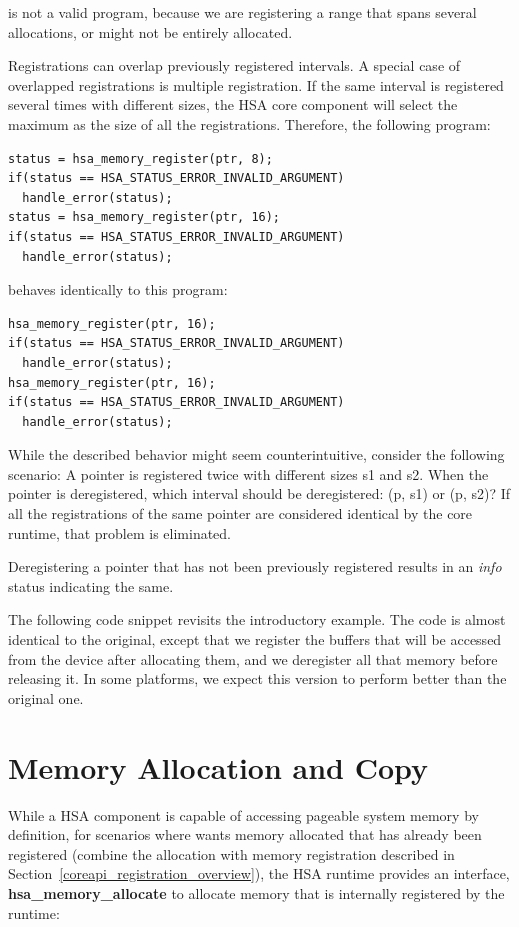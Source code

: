 \documentclass{book}
\newcommand{\reffun}[1]{\textbf{#1}}
\begin{document}
is not a valid program, because we are registering a range that
spans several allocations, or might not be entirely allocated.

Registrations can overlap previously registered intervals. A special
case of overlapped registrations is multiple registration. If the
same interval is registered several times with different sizes, the
HSA core component will select the maximum as the size of all
the registrations. Therefore, the following program:

\begin{lstlisting}
status = hsa_memory_register(ptr, 8);
if(status == HSA_STATUS_ERROR_INVALID_ARGUMENT)
  handle_error(status);
status = hsa_memory_register(ptr, 16);
if(status == HSA_STATUS_ERROR_INVALID_ARGUMENT)
  handle_error(status);
\end{lstlisting}

behaves identically to this program:

\begin{lstlisting}
hsa_memory_register(ptr, 16);
if(status == HSA_STATUS_ERROR_INVALID_ARGUMENT)
  handle_error(status);
hsa_memory_register(ptr, 16);
if(status == HSA_STATUS_ERROR_INVALID_ARGUMENT)
  handle_error(status);
\end{lstlisting}

While the described behavior might seem counterintuitive, consider
the following scenario: A pointer is registered twice with
different sizes s1 and s2. When the pointer is deregistered, which
interval should be deregistered: (p, s1) or (p, s2)? If all the
registrations of the same pointer are considered identical by the
core runtime, that problem is eliminated.

Deregistering a pointer that has not been previously registered
results in an \emph{info} status indicating the same.

The following code snippet revisits the introductory example. The
code is almost identical to the original, except that we register
the buffers that will be accessed from the device after allocating
them, and we deregister all that memory before releasing it. In some
platforms, we expect this version to perform better than the
original one.


\hypertarget{coreapi_device_memory}{}\section{Memory Allocation
and Copy}\label{coreapi_device_memory}

While a HSA component is capable of accessing pageable system memory
by definition, for scenarios where wants memory allocated that has
already been registered (combine the allocation with memory
registration described in
Section~\ref{coreapi_registration_overview}), the HSA runtime
provides an interface, \reffun{hsa\_memory\_allocate} to allocate
memory that is internally registered by the runtime:
\end{document}
